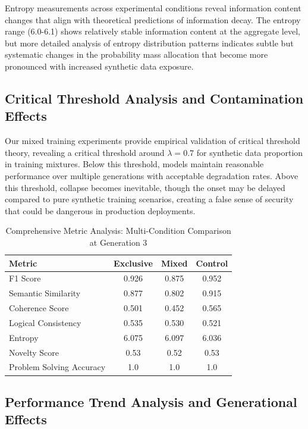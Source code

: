 \documentclass{article}
\begin{document}
Entropy measurements across experimental conditions reveal information content changes that align with theoretical predictions of information decay. The entropy range (6.0-6.1) shows relatively stable information content at the aggregate level, but more detailed analysis of entropy distribution patterns indicates subtle but systematic changes in the probability mass allocation that become more pronounced with increased synthetic data exposure.

\subsection{Critical Threshold Analysis and Contamination Effects}

Our mixed training experiments provide empirical validation of critical threshold theory, revealing a critical threshold around $\lambda = 0.7$ for synthetic data proportion in training mixtures. Below this threshold, models maintain reasonable performance over multiple generations with acceptable degradation rates. Above this threshold, collapse becomes inevitable, though the onset may be delayed compared to pure synthetic training scenarios, creating a false sense of security that could be dangerous in production deployments.

\begin{table}[h]
\centering
\caption{Comprehensive Metric Analysis: Multi-Condition Comparison at Generation 3}
\label{tab:comprehensive_metrics}
\begin{tabular}{lccc}
\toprule
\textbf{Metric} & \textbf{Exclusive} & \textbf{Mixed} & \textbf{Control} \\
\midrule
F1 Score & 0.926 & 0.875 & 0.952 \\
Semantic Similarity & 0.877 & 0.802 & 0.915 \\
Coherence Score & 0.501 & 0.452 & 0.565 \\
Logical Consistency & 0.535 & 0.530 & 0.521 \\
Entropy & 6.075 & 6.097 & 6.036 \\
Novelty Score & 0.53 & 0.52 & 0.53 \\
Problem Solving Accuracy & 1.0 & 1.0 & 1.0 \\
\bottomrule
\end{tabular}
\end{table}

\subsection{Performance Trend Analysis and Generational Effects}
\end{document}
